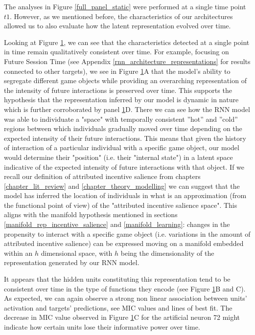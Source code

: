 \begin{figure}[ht]
\label{full_panel_temporal}
\end{figure}

The analyses in Figure \ref{full_panel_static} were performed at a single time point $t1$. However, as we mentioned before, the characteristics of our architectures allowed us to also evaluate how the latent representation evolved over time. 

Looking at Figure \ref{full_panel_temporal}, we can see that the characteristics detected at a single point in time remain qualitatively consistent over time. For example, focusing on Future Session Time (see Appendix \ref{rnn_architecture_representations} for results connected to other targets), we see in Figure \ref{full_panel_temporal}A that the model's ability to segregate different game objects while providing an  overarching representation of the intensity of future interactions is preserved over time. This supports the hypothesis that the representation inferred by our model is dynamic in nature which is further corroborated by panel \ref{full_panel_temporal}D. There we can see how the RNN model was able to individuate a "space" with temporally consistent ”hot” and ”cold” regions between which individuals gradually moved over time depending on the expected intensity of their future interactions. This means that given the history of interaction of a particular individual with a specific game object, our model would determine their "position" (i.e. their "internal state") in a latent space indicative of the expected intensity of future interactions with that object. If we recall our definition of attributed incentive salience from chapters \ref{chapter_lit_review} and \ref{chapter_theory_modelling} we can suggest that the model has inferred the location of individuals in what is an approximation (from the functional point of view) of the "attributed incentive salience space". This aligns with the manifold hypothesis mentioned in sections \ref{manifold_rep_incentive_salience} and \ref{manifold_learning}: changes in the propensity to interact with a specific game object (i.e. variations in the amount of attributed incentive salience) can be expressed moving on a manifold embedded within an $h$ dimensional space, with $h$ being the dimensionality of the representation generated by our RNN model. 

It appears that the hidden units constituting this representation tend to be consistent over time in the type of functions they encode (see Figure \ref{full_panel_temporal}B and C). As expected, we can again observe a strong non linear association between units' activation and targets' predictions, see MIC values and lines of best fit. The decrease in MIC value observed in Figure \ref{full_panel_temporal}C for the artificial neuron 72 might indicate how certain units lose their informative power over time.

